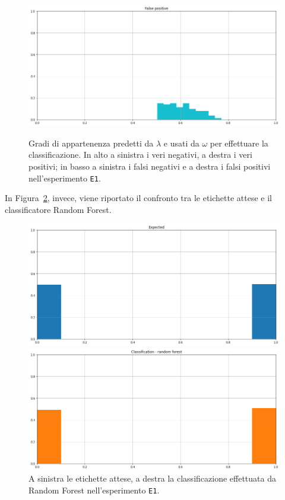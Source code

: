\documentclass[12pt]{report}
\theoremstyle{definition}
\begin{document}
\begin{figure}
   \begin{minipage}{0.48\textwidth}
     \includegraphics[width=\linewidth]{images/experiment_uniform_disgiunti/fp.png}\label{fp_ud}
   \end{minipage}
   \caption{Gradi di appartenenza predetti da $\lambda$ e usati da $\omega$ per effettuare la classificazione. In alto a sinistra i veri negativi, a destra i veri positivi; in basso a sinistra i falsi negativi e a destra i falsi positivi nell'esperimento \texttt{E1}.}
   \label{4cases_exp1}
\end{figure}
 In Figura~\ref{rf_class_exp1}, invece, viene riportato il confronto tra le etichette attese e il classificatore Random Forest.
\begin{figure}
\centering
    \begin{minipage}{0.48\textwidth}
        \includegraphics[width=\linewidth]{images/experiment_uniform_disgiunti/expected_classification.png}
    \end{minipage}
    \begin{minipage}{0.48\textwidth}
        \includegraphics[width=\linewidth]{images/experiment_uniform_disgiunti/prediction_classification_rf.png}
    \end{minipage}
    \caption{A sinistra le etichette attese, a destra la classificazione effettuata da Random Forest nell'esperimento \texttt{E1}.}
    \label{rf_class_exp1}
\end{figure} 
\end{document}
